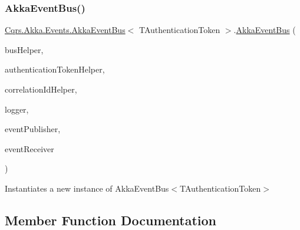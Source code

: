 \subsubsection{\texorpdfstring{Akka\+Event\+Bus()}{AkkaEventBus()}}
{\footnotesize\ttfamily \hyperlink{classCqrs_1_1Akka_1_1Events_1_1AkkaEventBus}{Cqrs.\+Akka.\+Events.\+Akka\+Event\+Bus}$<$ T\+Authentication\+Token $>$.\hyperlink{classCqrs_1_1Akka_1_1Events_1_1AkkaEventBus}{Akka\+Event\+Bus} (\begin{DoxyParamCaption}\item[{\hyperlink{interfaceCqrs_1_1Bus_1_1IBusHelper}{I\+Bus\+Helper}}]{bus\+Helper,  }\item[{\hyperlink{interfaceCqrs_1_1Authentication_1_1IAuthenticationTokenHelper}{I\+Authentication\+Token\+Helper}$<$ T\+Authentication\+Token $>$}]{authentication\+Token\+Helper,  }\item[{I\+Correlation\+Id\+Helper}]{correlation\+Id\+Helper,  }\item[{I\+Logger}]{logger,  }\item[{\hyperlink{interfaceCqrs_1_1Events_1_1IEventPublisher}{I\+Event\+Publisher}$<$ T\+Authentication\+Token $>$}]{event\+Publisher,  }\item[{\hyperlink{interfaceCqrs_1_1Events_1_1IEventReceiver}{I\+Event\+Receiver}$<$ T\+Authentication\+Token $>$}]{event\+Receiver }\end{DoxyParamCaption})}



Instantiates a new instance of Akka\+Event\+Bus$<$\+T\+Authentication\+Token$>$ 



\subsection{Member Function Documentation}
\mbox{\label{classCqrs_1_1Akka_1_1Events_1_1AkkaEventBus_a1a89590afc6970f00fe055961a6773e8_a1a89590afc6970f00fe055961a6773e8}} 
